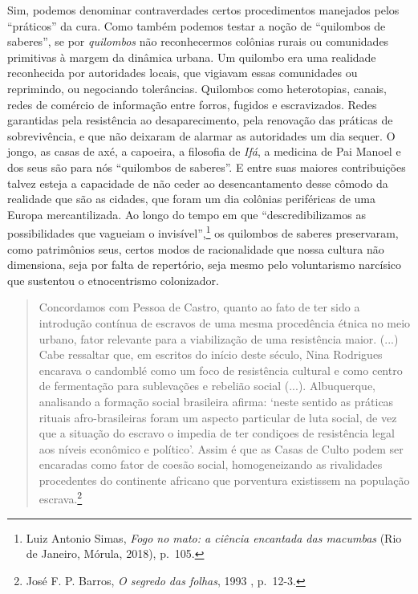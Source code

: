 Sim, podemos denominar contraverdades certos procedimentos manejados
pelos ``práticos'' da cura. Como também podemos testar a noção de
``quilombos de saberes'', se por \emph{quilombos} não reconhecermos
colônias rurais ou comunidades primitivas à margem da dinâmica urbana.
Um quilombo era uma realidade reconhecida por autoridades locais, que
vigiavam essas comunidades ou reprimindo, ou negociando tolerâncias.
Quilombos como heterotopias, canais, redes de comércio de informação
entre forros, fugidos e escravizados. Redes garantidas pela resistência
ao desaparecimento, pela renovação das práticas de sobrevivência, e que
não deixaram de alarmar as autoridades um dia sequer. O jongo, as casas
de axé, a capoeira, a filosofia de \emph{Ifá}, a medicina de Pai Manoel
e dos seus são para nós ``quilombos de saberes''. E entre suas maiores
contribuições talvez esteja a capacidade de não ceder ao desencantamento
desse cômodo da realidade que são as cidades, que foram um dia colônias
periféricas de uma Europa mercantilizada. Ao longo do tempo em que
``descredibilizamos as possibilidades que vagueiam o
invisível'',\footnote{Luiz Antonio Simas, \emph{Fogo no mato: a ciência
  encantada das macumbas} (Rio de Janeiro, Mórula, 2018), p.~105.} os
quilombos de saberes preservaram, como patrimônios seus, certos modos de
racionalidade que nossa cultura não dimensiona, seja por falta de
repertório, seja mesmo pelo voluntarismo narcísico que sustentou o
etnocentrismo colonizador.

\begin{quote}
Concordamos com Pessoa de Castro, quanto ao fato de ter sido a
introdução contínua de escravos de uma mesma procedência étnica no meio
urbano, fator relevante para a viabilização de uma resistência maior.
(...) Cabe ressaltar que, em escritos do início deste século, Nina
Rodrigues encarava o candomblé como um foco de resistência cultural e
como centro de fermentação para sublevações e rebelião social (...).
Albuquerque, analisando a formação social brasileira afirma: `neste
sentido as práticas rituais afro-brasileiras foram um aspecto particular
de luta social, de vez que a situação do escravo o impedia de ter
condiçoes de resistência legal aos níveis econômico e político'. Assim é
que as Casas de Culto podem ser encaradas como fator de coesão social,
homogeneizando as rivalidades procedentes do continente africano que
porventura existissem na população escrava.\footnote{José F. P. Barros,
  \emph{O segredo das folhas}, 1993 , p.~12-3.}
\end{quote}

